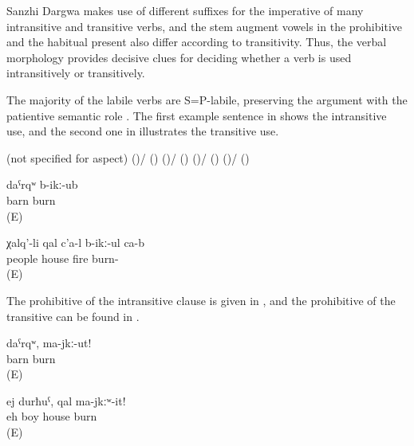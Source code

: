 Sanzhi Dargwa makes use of different suffixes for the imperative of many intransitive and transitive verbs, and the stem augment vowels in the prohibitive and the habitual present also differ according to transitivity. Thus, the verbal morphology provides decisive clues for deciding whether a verb is used intransitively or transitively.

The majority of the labile verbs are S=P-labile, preserving the argument with the patientive semantic role . The first example sentence in  shows the intransitive use, and the second one in  illustrates the transitive use.
%
\begin{exe}
	\ex	\label{ex:S=P labile verbs}
	\begin{xlist}
		\ex {}  (not specified for aspect)
		\ex	{} ()\slash{} () 
		\ex	{} ()\slash{} () 
		\ex	{} ()\slash{} () 
		\ex	{} ()\slash{} () 
	\end{xlist}
\end{exe}

%
\begin{exe}
	\ex	\label{ex:The barn burnt}
	\gll	daˁrqʷ	b-ikː-ub\\
		barn	burn\\
	\glt	{} (E)

	\ex	\label{ex:The people burn the house with fire}
	\gll	χalq'-li	qal	c'a-l	b-ikː-ul	ca-b\\
		people	house	fire	burn-	\\
	\glt	{} (E)
\end{exe}

The prohibitive of the intransitive clause is given in , and the prohibitive of the transitive can be found in .
%
\begin{exe}
	\ex	\label{ex:‎‎‎Barn, do not burn}
	\gll	daˁrqʷ,	ma-jkː-ut!\\
		barn	burn\\
	\glt	{} (E)

	\ex	\label{ex:‎Eh boy, do not burn the house}
	\gll	ej	durħuˁ,		qal	ma-jkːʷ-it!\\
		eh	boy	house	burn\\
	\glt	{} (E)
\end{exe}


